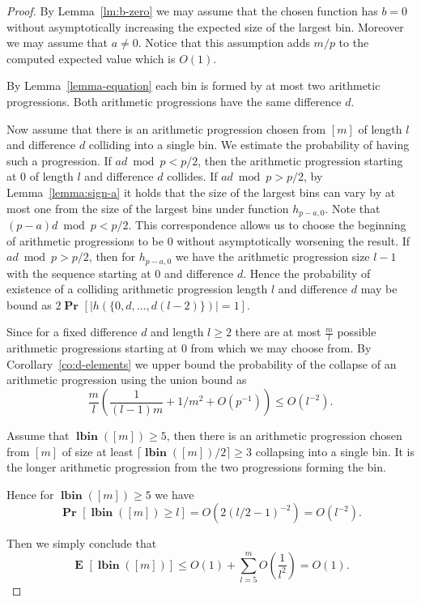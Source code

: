 \documentclass{article}
\newcommand{\vlbin}[1]{\operatorname{\mathbf{lbin}}({#1})}
\newcommand{\probs}[2]{\operatorname{\mathbf{Pr}}_{{#1}}\left[{#2}\right]}
\newcommand{\prob}[1]{\probs{}{#1}}
\newcommand{\expects}[2]{\operatorname{\mathbf{E}}_{{#1}}\left[{#2}\right]}
\newcommand{\expect}[1]{\expects{}{#1}}
\begin{document}
\begin{proof}
By Lemma~\ref{lm:b-zero} we may assume that the chosen function has $b = 0$ without asymptotically increasing the expected size of the largest bin. Moreover we may assume that $a \neq 0$. Notice that this assumption adds $m/p$ to the computed expected value which is $O(1)$.

By Lemma~\ref{lemma-equation} each bin is formed by at most two arithmetic progressions. Both arithmetic progressions have the same difference $d$.

Now assume that there is an arithmetic progression chosen from $[m]$ of length $l$ and difference $d$ colliding into a single bin.
We estimate the probability of having such a progression.
If $ad \bmod p < p/2$, then the arithmetic progression starting at $0$ of length $l$ and difference $d$ collides. 
If $ad \bmod p > p/2$, by Lemma~\ref{lemma:sign-a} it holds that the size of the largest bins can vary by at most one from the size of the largest bins under function $h_{p - a, 0}$. 
Note that $(p - a)d \bmod p < p/2$.
This correspondence allows us to choose the beginning of arithmetic progressions to be $0$ without asymptotically worsening the result.
If $ad \bmod p > p / 2$, then for $h_{p - a, 0}$ we have the arithmetic progression size $l - 1$ with the sequence starting at $0$ and difference $d$.
Hence the probability of existence of a colliding arithmetic progression length $l$ and difference $d$ may be bound as $2\prob{|h(\{0, d, \dots, d(l-2)\})| = 1}$.

Since for a fixed difference $d$ and length $l \geq 2$ there are at most $\frac{m}{l}$ possible arithmetic progressions starting at $0$ from which we may choose from. By Corollary~\ref{co:d-elements} we upper bound the probability of the collapse of an arithmetic progression using the union bound as 
\[
\frac{m}{l} \left(\frac{1}{(l - 1)m} + 1/m^2 + O(p^{-1})\right) \leq O(l^{-2}).
\]

Assume that $\vlbin{[m]} \geq 5$, then there is an arithmetic progression chosen from $[m]$ of size at least $\lceil \vlbin{[m]}/2 \rceil \geq 3$ collapsing into a single bin.
It is the longer arithmetic progression from the two progressions forming the bin. 

Hence for $\vlbin{[m]} \geq 5$ we have
\[
\prob{\vlbin{[m]} \geq l} = O(2(l / 2 - 1)^{-2}) = O(l^{-2}).
\]

Then we simply conclude that
\[
\expect{\vlbin{[m]}} \leq O(1) + \sum_{l = 5}^m O\left(\frac{1}{l^2}\right) = O(1).
\]

\end{proof}
\end{document}
